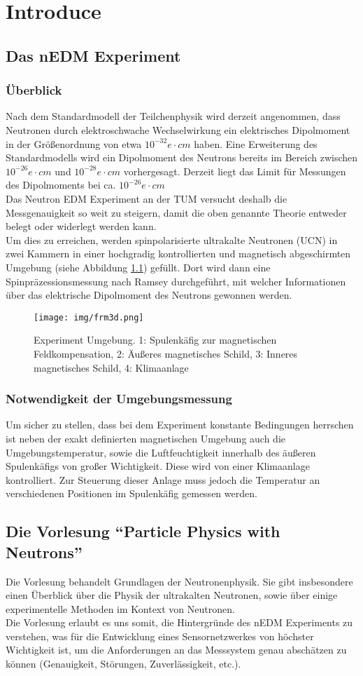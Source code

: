 \chapter{Introduce}
\section*{Das nEDM Experiment}
\subsection*{Überblick}
Nach dem Standardmodell der Teilchenphysik wird derzeit angenommen, dass
Neutronen durch elektroschwache Wechselwirkung ein elektrisches Dipolmoment
in der Größenordnung von etwa $10^{-32}e\cdot cm$ haben. Eine Erweiterung des
Standardmodells wird ein Dipolmoment des Neutrons bereits im Bereich zwischen
$10^{-26}e\cdot cm$ und $10^{-28}e\cdot cm$ vorhergesagt. Derzeit liegt das
Limit für Messungen des Dipolmoments bei ca. $10^{-26}e\cdot cm$\\
Das Neutron EDM Experiment an der TUM versucht deshalb die Messgenauigkeit so
weit zu steigern, damit die oben genannte Theorie entweder belegt oder
widerlegt werden kann.\\
Um dies zu erreichen, werden spinpolarisierte ultrakalte Neutronen (UCN) in
zwei Kammern in einer hochgradig kontrollierten und magnetisch abgeschirmten
Umgebung (siehe Abbildung \ref{fig:exp}) gefüllt. Dort wird dann eine
Spin\-präzessions\-messung nach Ramsey
durchgeführt, mit welcher Informationen über das elektrische Dipolmoment des
Neutrons gewonnen werden.
\begin{figure}[h]
\centering
\texttt{[image: img/frm3d.png]}
\caption{Experiment Umgebung. 1: Spulenkäfig zur magnetischen Feldkompensation,
2: Äußeres magnetisches Schild, 3: Inneres magnetisches Schild, 4: Klimaanlage}
\label{fig:exp}
\end{figure}
\subsection*{Notwendigkeit der Umgebungsmessung}
Um sicher zu stellen, dass bei dem Experiment konstante Bedingungen herrschen
ist neben der exakt definierten magnetischen Umgebung auch die 
Umgebungstemperatur, sowie die Luftfeuchtigkeit innerhalb des äußeren
Spulenkäfigs von großer Wichtigkeit. Diese wird von einer Klimaanlage
kontrolliert. Zur Steuer\-ung dieser Anlage muss jedoch die Tempera\-tur an
verschiedenen Positionen im Spulenkäfig gemessen werden.
\section*{Die Vorlesung ``Particle Physics with Neutrons''}
Die Vorlesung behandelt Grundlagen der Neutronenphysik. Sie gibt insbesondere
einen Überblick über die Physik der ultrakalten Neutronen, sowie über einige
experimentelle Methoden im Kontext von Neutronen.\\
Die Vorlesung erlaubt es uns somit, die Hintergründe des nEDM Experiments zu
verstehen, was für die Entwicklung eines Sensornetzwerkes von höchster
Wichtigkeit ist, um die Anforderungen an das Messsystem genau abschätzen zu
können (Genauigkeit, Störungen, Zuverlässigkeit, etc.).

